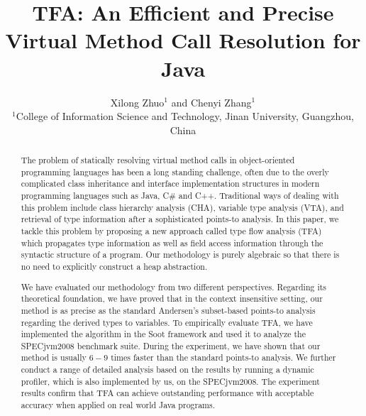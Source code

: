 \documentclass{fac}
\title{TFA: An Efficient and Precise Virtual Method Call Resolution for Java}
\author[Xilong Zhuo and Chenyi Zhang]
    {Xilong Zhuo$^1$ and Chenyi Zhang$^1$\\
     $^1$College of Information Science and Technology, Jinan University, Guangzhou, China}
\begin{document}
\label{firstpage}

\makecorrespond

\maketitle

\begin{abstract}
The problem of statically resolving virtual method calls in object-oriented programming languages has been a long standing challenge, often due to the overly complicated class inheritance and interface implementation structures in modern programming languages such as Java, C$\#$ and C++. Traditional ways of dealing with this problem include class hierarchy analysis (CHA), variable type analysis (VTA), and retrieval of type information after a sophisticated points-to analysis. In this paper, we tackle this problem by proposing a new approach called type flow analysis (TFA) which propagates type information as well as field access information through the syntactic structure of a program. Our methodology is purely algebraic so that there is no need to explicitly construct a heap abstraction.

We have evaluated our methodology from two different perspectives. Regarding its theoretical foundation, we have proved that in the context insensitive setting, our method is as precise as the standard Andersen's subset-based points-to analysis regarding the derived types to variables. To empirically evaluate TFA, we have implemented the algorithm in the Soot framework and used it to analyze the SPECjvm2008 benchmark suite. During the experiment, we have shown that our method is usually $6-9$ times faster than the standard points-to analysis. We further conduct a range of detailed analysis based on the results by running a dynamic profiler, which is also implemented by us, on the SPECjvm2008. The experiment results confirm that TFA can achieve outstanding performance with acceptable accuracy when applied on real world Java programs.

\end{abstract}
\end{document}
